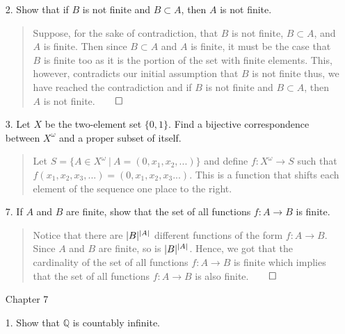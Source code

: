 \documentclass[12pt, a4paper]{article}
\newcommand{\rats}{\mathbb{Q}} %
\DeclarePairedDelimiter\abs{\lvert}{\rvert}
\newcommand{\rarr}{\rightarrow}
\begin{document}
\begin{itemize}
\item[2.]
Show that if $B$ is not finite and $B \subset A$, then $A$ is not finite.
\begin{quote}
Suppose, for the sake of contradiction, that $B$ is not finite, $B \subset A$, and $A$ is finite.
Then since $B \subset A$ and $A$ is finite, it must be the case that $B$ is finite too as it is
the portion of the set with finite elements. This, however, contradicts our initial assumption that $B$
is not finite thus, we have reached the contradiction and if $B$ is not finite and $B \subset A$, then $A$
is not finite.$\qed$
\end{quote}

\item[]

\item[3.]
Let $X$ be the two-element set $\{0, 1\}$. Find a bijective correspondence between $X^\omega$ and a proper
subset of itself.
\begin{quote}
Let $S = \{A \in X^\omega \ | \ A = (0, x_1, x_2, ...)\}$ and define $f : X^\omega \rarr S$ such that $f(x_1, x_2, x_3, ...) = (0, x_1, x_2, x_3 ...)$.
This is a function that shifts each element of the sequence one place to the right.
\end{quote}

\item[]

\item[7.]
If $A$ and $B$ are finite, show that the set of all functions $f : A \rarr B$ is finite.
\begin{quote}
Notice that there are $\abs{B}^{\abs{A}}$ different functions of the form $f : A \rarr B$.
Since $A$ and $B$ are finite, so is $\abs{B}^{\abs{A}}$. Hence, we got that the cardinality
of the set of all functions $f : A \rarr B$ is finite which implies that the set of all functions
$f : A \rarr B$ is also finite.$\qed$
\end{quote}

\item[]
\item[]
\item[]

{\large Chapter 7}
\vspace{0.3cm}

\item[1.]
Show that $\rats$ is countably infinite.


\end{itemize}
\end{document}
